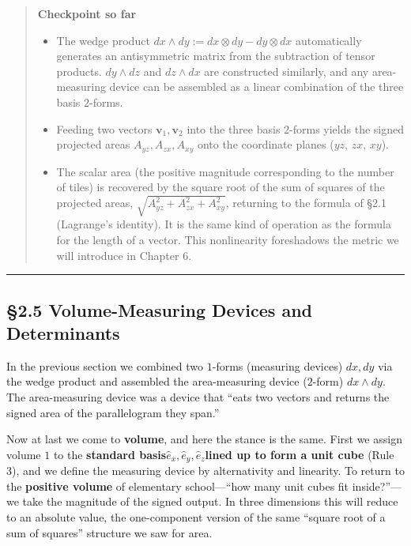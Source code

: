 \begin{quote}
\textbf{Checkpoint so far}

\begin{itemize}
\item
  The wedge product \(dx \wedge dy := dx \otimes dy - dy \otimes dx\)
  automatically generates an antisymmetric matrix from the subtraction
  of tensor products. \(dy \wedge dz\) and \(dz \wedge dx\) are
  constructed similarly, and any area-measuring device can be assembled
  as a linear combination of the three basis \(2\)-forms.
\item
  Feeding two vectors \(\mathbf{v}_1,\mathbf{v}_2\) into the three basis
  \(2\)-forms yields the signed projected areas \(A_{yz},A_{zx},A_{xy}\)
  onto the coordinate planes (\(yz\), \(zx\), \(xy\)).
\item
  The scalar area (the positive magnitude corresponding to the number of
  tiles) is recovered by the square root of the sum of squares of the
  projected areas, \(\sqrt{A_{yz}^2 + A_{zx}^2 + A_{xy}^2}\), returning
  to the formula of §2.1 (Lagrange's identity). It is the same kind of
  operation as the formula for the length of a vector. This nonlinearity
  foreshadows the metric we will introduce in Chapter 6.
\end{itemize}
\end{quote}

\begin{center}\rule{0.5\linewidth}{0.5pt}\end{center}

\hypertarget{volume-measuring-devices-and-determinants}{%
\subsection{§2.5 Volume-Measuring Devices and
Determinants}\label{volume-measuring-devices-and-determinants}}

In the previous section we combined two \(1\)-forms (measuring devices)
\(dx, dy\) via the wedge product and assembled the area-measuring device
(\(2\)-form) \(dx \wedge dy\). The area-measuring device was a device
that ``eats two vectors and returns the signed area of the parallelogram
they span.''

Now at last we come to \textbf{volume}, and here the stance is the same.
First we assign volume \(1\) to the
\textbf{standard basis}\(\hat{e}_x,\hat{e}_y,\hat{e}_z\)\textbf{lined up to form a unit cube}
(Rule 3), and we define the measuring device by alternativity and
linearity. To return to the \textbf{positive volume} of elementary
school---``how many unit cubes fit inside?''---we take the magnitude of
the signed output. In three dimensions this will reduce to an absolute
value, the one-component version of the same ``square root of a sum of
squares'' structure we saw for area.


